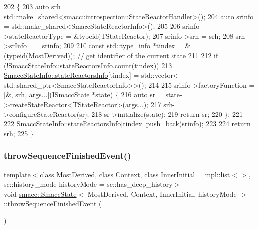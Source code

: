 \begin{DoxyCode}
202   \{
203     \textcolor{keyword}{auto} srh = std::make\_shared<smacc::introspection::StateReactorHandler>();
204     \textcolor{keyword}{auto} srinfo = std::make\_shared<SmaccStateReactorInfo>();
205 
206     srinfo->stateReactorType = &\textcolor{keyword}{typeid}(TStateReactor);
207     srinfo->srh = srh;
208     srh->srInfo\_ = srinfo;
209 
210     \textcolor{keyword}{const} std::type\_info *tindex = &(\textcolor{keyword}{typeid}(MostDerived)); \textcolor{comment}{// get identifier of the current state}
211 
212     \textcolor{keywordflow}{if} (!\hyperlink{classsmacc_1_1introspection_1_1SmaccStateInfo_abd1d6ca5060c87f6bd11fde3e5b2ac4d}{SmaccStateInfo::stateReactorsInfo}.count(tindex))
213       \hyperlink{classsmacc_1_1introspection_1_1SmaccStateInfo_abd1d6ca5060c87f6bd11fde3e5b2ac4d}{SmaccStateInfo::stateReactorsInfo}[tindex] = std::vector<
      std::shared\_ptr<SmaccStateReactorInfo>>();
214 
215     srinfo->factoryFunction = [&, srh, \hyperlink{namespacegenerate__debs_a75f9143e38df82d83b2e8a6f99cae02c}{args}...](ISmaccState *state) \{
216       \textcolor{keyword}{auto} sr = state->createStateReactor<TStateReactor>(\hyperlink{namespacegenerate__debs_a75f9143e38df82d83b2e8a6f99cae02c}{args}...);
217       srh->configureStateReactor(sr);
218       sr->initialize(state);
219       \textcolor{keywordflow}{return} sr;
220     \};
221 
222     \hyperlink{classsmacc_1_1introspection_1_1SmaccStateInfo_abd1d6ca5060c87f6bd11fde3e5b2ac4d}{SmaccStateInfo::stateReactorsInfo}[tindex].push\_back(srinfo);
223 
224     \textcolor{keywordflow}{return} srh;
225   \}
\end{DoxyCode}
\mbox{\label{classsmacc_1_1SmaccState_a49dcfc25824f7e083dd4b999c49ab2b6}} 
\subsubsection{\texorpdfstring{throw\+Sequence\+Finished\+Event()}{throwSequenceFinishedEvent()}}
{\footnotesize\ttfamily template$<$class Most\+Derived, class Context, class Inner\+Initial = mpl\+::list$<$$>$, sc\+::history\+\_\+mode history\+Mode = sc\+::has\+\_\+deep\+\_\+history$>$ \\
void \hyperlink{classsmacc_1_1SmaccState}{smacc\+::\+Smacc\+State}$<$ Most\+Derived, Context, Inner\+Initial, history\+Mode $>$\+::throw\+Sequence\+Finished\+Event (\begin{DoxyParamCaption}{ }\end{DoxyParamCaption})\hspace{0.3cm}{\ttfamily [inline]}}



